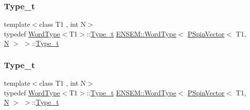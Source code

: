 \subsubsection{\texorpdfstring{Type\_t}{Type\_t}\hspace{0.1cm}{\footnotesize\ttfamily [1/3]}}
{\footnotesize\ttfamily template$<$class T1 , int N$>$ \\
typedef \mbox{\hyperlink{structENSEM_1_1WordType}{Word\+Type}}$<$T1$>$\+::\mbox{\hyperlink{structENSEM_1_1WordType_3_01PSpinVector_3_01T1_00_01N_01_4_01_4_addbb91e7d2c1c1c79f012acf1cd02ce3}{Type\+\_\+t}} \mbox{\hyperlink{structENSEM_1_1WordType}{E\+N\+S\+E\+M\+::\+Word\+Type}}$<$ \mbox{\hyperlink{classENSEM_1_1PSpinVector}{P\+Spin\+Vector}}$<$ T1, \mbox{\hyperlink{adat__devel_2lib_2hadron_2operator__name__util_8cc_a7722c8ecbb62d99aee7ce68b1752f337}{N}} $>$ $>$\+::\mbox{\hyperlink{structENSEM_1_1WordType_3_01PSpinVector_3_01T1_00_01N_01_4_01_4_addbb91e7d2c1c1c79f012acf1cd02ce3}{Type\+\_\+t}}}

\mbox{\label{structENSEM_1_1WordType_3_01PSpinVector_3_01T1_00_01N_01_4_01_4_addbb91e7d2c1c1c79f012acf1cd02ce3}} 
\subsubsection{\texorpdfstring{Type\_t}{Type\_t}\hspace{0.1cm}{\footnotesize\ttfamily [2/3]}}
{\footnotesize\ttfamily template$<$class T1 , int N$>$ \\
typedef \mbox{\hyperlink{structENSEM_1_1WordType}{Word\+Type}}$<$T1$>$\+::\mbox{\hyperlink{structENSEM_1_1WordType_3_01PSpinVector_3_01T1_00_01N_01_4_01_4_addbb91e7d2c1c1c79f012acf1cd02ce3}{Type\+\_\+t}} \mbox{\hyperlink{structENSEM_1_1WordType}{E\+N\+S\+E\+M\+::\+Word\+Type}}$<$ \mbox{\hyperlink{classENSEM_1_1PSpinVector}{P\+Spin\+Vector}}$<$ T1, \mbox{\hyperlink{adat__devel_2lib_2hadron_2operator__name__util_8cc_a7722c8ecbb62d99aee7ce68b1752f337}{N}} $>$ $>$\+::\mbox{\hyperlink{structENSEM_1_1WordType_3_01PSpinVector_3_01T1_00_01N_01_4_01_4_addbb91e7d2c1c1c79f012acf1cd02ce3}{Type\+\_\+t}}}

\mbox{\label{structENSEM_1_1WordType_3_01PSpinVector_3_01T1_00_01N_01_4_01_4_addbb91e7d2c1c1c79f012acf1cd02ce3}} 
